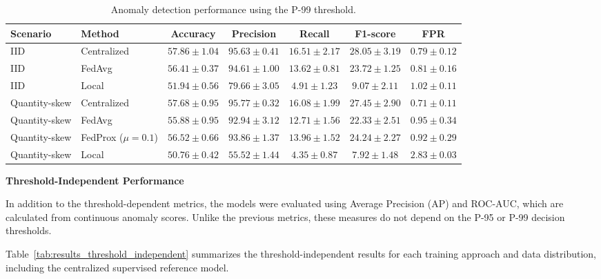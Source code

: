 \documentclass[12pt]{article}
\begin{document}
\begin{table}[t]
	\centering
	\caption{Anomaly detection performance using the P-99 threshold.}
	\label{tab:results_p99}
	\begin{tabular}{llccccc}
		\toprule
		\textbf{Scenario} & \textbf{Method} & \textbf{Accuracy} & \textbf{Precision} & \textbf{Recall} & \textbf{F1-score} & \textbf{FPR} \\
		\midrule
		IID & Centralized & $57.86 \pm 1.04$ & $95.63 \pm 0.41$ & $16.51 \pm 2.17$ & $28.05 \pm 3.19$ & $0.79 \pm 0.12$ \\
		IID & FedAvg & $56.41 \pm 0.37$ & $94.61 \pm 1.00$ & $13.62 \pm 0.81$ & $23.72 \pm 1.25$ & $0.81 \pm 0.16$ \\
		IID & Local & $51.94 \pm 0.56$ & $79.66 \pm 3.05$ & $4.91 \pm 1.23$ & $9.07 \pm 2.11$ & $1.02 \pm 0.11$ \\
		\midrule
		Quantity-skew & Centralized & $57.68 \pm 0.95$ & $95.77 \pm 0.32$ & $16.08 \pm 1.99$ & $27.45 \pm 2.90$ & $0.71 \pm 0.11$ \\
		Quantity-skew & FedAvg & $55.88 \pm 0.95$ & $92.94 \pm 3.12$ & $12.71 \pm 1.56$ & $22.33 \pm 2.51$ & $0.95 \pm 0.34$ \\
		Quantity-skew & FedProx ($\mu=0.1$) & $56.52 \pm 0.66$ & $93.86 \pm 1.37$ & $13.96 \pm 1.52$ & $24.24 \pm 2.27$ & $0.92 \pm 0.29$ \\
		Quantity-skew & Local & $50.76 \pm 0.42$ & $55.52 \pm 1.44$ & $4.35 \pm 0.87$ & $7.92 \pm 1.48$ & $2.83 \pm 0.03$ \\
		\bottomrule
	\end{tabular}
\end{table}

\textbf{Threshold-Independent Performance}

In addition to the threshold-dependent metrics, the models were evaluated using Average Precision (AP) and ROC-AUC, which are calculated from continuous anomaly scores. Unlike the previous metrics, these measures do not depend on the P-95 or P-99 decision thresholds.

Table~\ref{tab:results_threshold_independent} summarizes the threshold-independent results for each training approach and data distribution, including the centralized supervised reference model.
\end{document}
